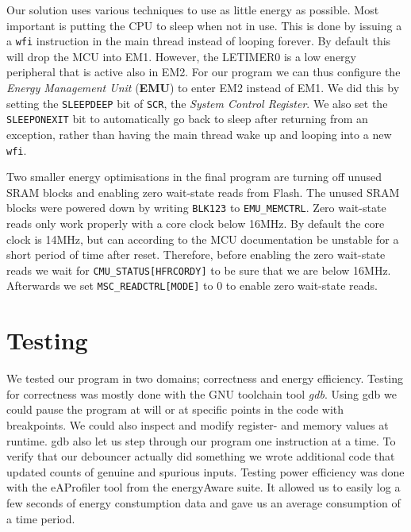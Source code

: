 Our solution uses various techniques to use as little energy as possible. Most
important is putting the CPU to sleep when not in use. This is done by issuing a
a {\tt wfi} instruction in the main thread instead of looping forever.
\cite{CortexM3Manual} By default this will drop the MCU into EM1. However, the
LETIMER0 is a low energy peripheral that is active also in EM2. For our program
we can thus configure the \emph{Energy Management Unit} (\textbf{EMU}) to enter
EM2 instead of EM1. We did this by setting the {\tt SLEEPDEEP} bit of {\tt SCR},
the \emph{System Control Register}. We also set the {\tt SLEEPONEXIT} bit to
automatically go back to sleep after returning from an exception, rather than
having the main thread wake up and looping into a new {\tt wfi}.

Two smaller energy optimisations in the final program are turning off unused
SRAM blocks and enabling zero wait-state reads from Flash. The unused SRAM
blocks were powered down by writing {\tt BLK123} to {\tt EMU\_MEMCTRL}. Zero
wait-state reads only work properly with a core clock below 16MHz. By default
the core clock is 14MHz, but can according to the MCU documentation be unstable
for a short period of time after reset. Therefore, before enabling the zero
wait-state reads we wait for {\tt CMU\_STATUS[HFRCORDY]} to be sure that we are
below 16MHz. Afterwards we set {\tt MSC\_READCTRL[MODE]} to 0 to enable zero
wait-state reads.

\section{Testing}

We tested our program in two domains; correctness and energy efficiency. Testing
for correctness was mostly done with the GNU toolchain tool \emph{gdb}. Using
gdb we could pause the program at will or at specific points in the code with
breakpoints. We could also inspect and modify register- and memory values at
runtime. gdb also let us step through our program one instruction at a time. To
verify that our debouncer actually did something we wrote additional code that
updated counts of genuine and spurious inputs. Testing power efficiency was done
with the eAProfiler tool from the energyAware suite. It allowed us to easily log
a few seconds of energy constumption data and gave us an average consumption of
a time period.
